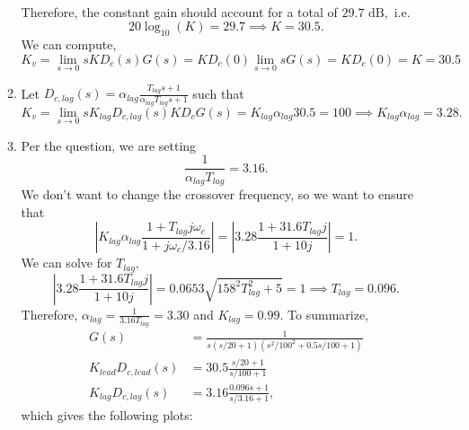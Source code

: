\documentclass{article}
\begin{document}
\begin{enumerate}[label=\textbf{4.\arabic*}]
\begin{enumerate}[label=(\alph*)]
\begin{align}
    \end{align}
    Therefore, the constant gain should account for a total of $29.7\text{ dB},$ i.e. 
    \begin{equation}
        20\log_{10}(K) = 29.7 \implies K = 30.5.
    \end{equation}
    We can compute,
    \begin{equation}
        K_v = \lim_{s\to 0} sKD_c(s)G(s) = KD_c(0) \lim_{s\to 0} sG(s) = KD_c(0) = K = 30.5
    \end{equation}
    \item Let $D_{c,lag}(s) = \alpha_{lag} \frac{T_{lag} s + 1}{\alpha_{lag} T_{lag} s + 1}$ such that 
    \begin{equation}
        K_v = \lim_{s\to 0} sK_{lag}D_{c,lag}(s)KD_c G(s) = K_{lag}\alpha_{lag} 30.5 = 100 \implies K_{lag}\alpha_{lag} = 3.28.
    \end{equation}
    \item Per the question, we are setting 
    \begin{equation}
        \frac{1}{\alpha_{lag} T_{lag}} = 3.16.
    \end{equation}
    We don't want to change the crossover frequency, so we want to ensure that 
    \begin{equation}
        \left|K_{lag}\alpha_{lag} \frac{1 + T_{lag}j\omega_c}{1+j\omega_c/3.16}\right| = \left|3.28\frac{1 + 31.6T_{lag}j}{1+10j}\right| = 1.
    \end{equation}
    We can solve for $T_{lag},$
    \begin{equation}
        \left|3.28\frac{1 + 31.6T_{lag}j}{1+10j}\right| = 0.0653\sqrt{158^2T_{lag}^2+5} =1 \implies T_{lag} = 0.096.
    \end{equation}
    Therefore, $\alpha_{lag}  = \frac{1}{3.16T_{lag}} = 3.30$ and $K_{lag} = 0.99.$ To summarize,
    \begin{align}
        G(s) &= \frac{1}{s(s/20+1)(s^2/100^2 + 0.5s/100 + 1)} \\ 
        K_{lead}D_{c,lead}(s) &= 30.5\frac{s/20 + 1}{s/100 + 1} \\ 
        K_{lag}D_{c,lag}(s) &= 3.16\frac{0.096s + 1}{s/3.16 + 1}, 
    \end{align}
    which gives the following plots:
    \begin{center}

\end{center}
\end{enumerate}
\end{enumerate}
\end{document}
